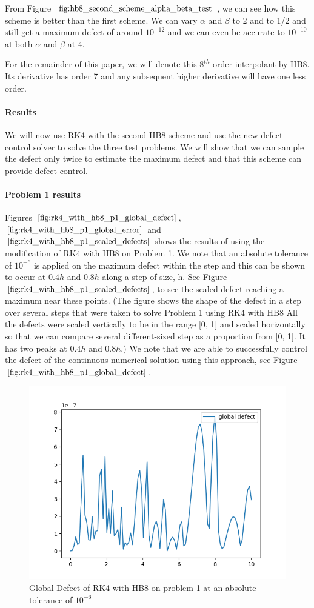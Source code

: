 \documentclass{article}
\begin{document}
From Figure $\ref{fig:hb8_second_scheme_alpha_beta_test}$, we can see how this scheme is better than the first scheme. We can vary $\alpha$ and $\beta$ to 2 and to 1/2 and still get a maximum defect of around $10^{-12}$ and we can even be accurate to $10^{-10}$ at both $\alpha$ and $\beta$ at 4. 

For the remainder of this paper, we will denote this $8^{th}$ order interpolant by HB8. Its derivative has order 7 and any subsequent higher derivative will have one less order.

\paragraph{Results}
We will now use RK4 with the second HB8 scheme and use the new defect control solver to solve the three test problems. We will show that we can sample the defect only twice to estimate the maximum defect and that this scheme can provide defect control.

\paragraph{Problem 1 results}
Figures $\ref{fig:rk4_with_hb8_p1_global_defect}$, $\ref{fig:rk4_with_hb8_p1_global_error}$ and $\ref{fig:rk4_with_hb8_p1_scaled_defects}$ shows the results of using the modification of RK4 with HB8 on Problem 1. We note that an absolute tolerance of $10^{-6}$ is applied on the maximum defect within the step and this can be shown to occur at $0.4h$ and $0.8h$ along a step of size, h. See Figure $\ref{fig:rk4_with_hb8_p1_scaled_defects}$, to see the scaled defect reaching a maximum near these points. (The figure shows the shape of the defect in a step over several steps that were taken to solve Problem 1 using RK4 with HB8 All the defects were scaled vertically to be in the range [0, 1] and scaled horizontally so that we can compare several different-sized step as a proportion from [0, 1]. It has two peaks at $0.4h$ and $0.8h$.) We note that we are able to successfully control the defect of the continuous numerical solution using this approach, see Figure $\ref{fig:rk4_with_hb8_p1_global_defect}$. 

\begin{figure}[H]
\centering
\includegraphics[width=0.7\linewidth]{./figures/rk4_with_hb8_p1_global_defect}
\caption{Global Defect of RK4 with HB8 on problem 1 at an absolute tolerance of $10^{-6}$}
\label{fig:rk4_with_hb8_p1_global_defect}
\end{figure}
\end{document}
